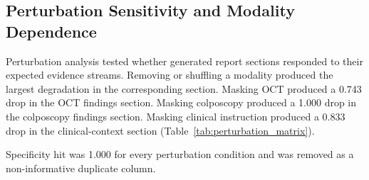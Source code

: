 \documentclass[11pt, a4paper]{article}
\theoremstyle{plain}
\theoremstyle{definition}
\begin{document}
\FloatBarrier

\subsection{Perturbation Sensitivity and Modality Dependence}
\label{subsec:perturbation_results}

Perturbation analysis tested whether generated report sections responded to their expected evidence streams. Removing or shuffling a modality produced the largest degradation in the corresponding section. Masking OCT produced a 0.743 drop in the OCT findings section. Masking colposcopy produced a 1.000 drop in the colposcopy findings section. Masking clinical instruction produced a 0.833 drop in the clinical-context section (Table~\ref{tab:perturbation_matrix}).

\begin{table}[!htbp]
  \centering
  \caption{Perturbation sensitivity matrix. Drops are relative to normal decoding.}
  \label{tab:perturbation_matrix}
  \scriptsize
  \begin{threeparttable}
  \begin{tablenotes}[flushleft]
    \footnotesize
    \item Specificity hit was 1.000 for every perturbation condition and was removed as a non-informative duplicate column.
  \end{tablenotes}
  \end{threeparttable}
\end{table}
\end{document}
